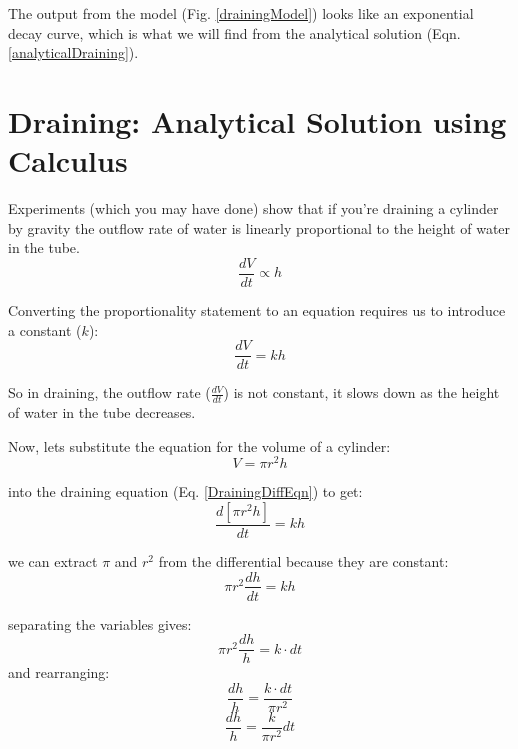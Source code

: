 \documentclass[11pt,fleqn]{article}
\begin{document}
	
	

The output from the model (Fig. \ref{drainingModel}) looks like an exponential decay curve, which is what we will find from the analytical solution (Eqn. \ref{analyticalDraining}).



\section{Draining: Analytical Solution using Calculus}
	Experiments (which you may have done) show that if you're draining a cylinder by gravity the outflow rate of water is linearly proportional to the height of water in the tube. 
	\begin{equation}
		\frac{dV}{dt} \propto h
	\end{equation}

	Converting the proportionality statement to an equation requires us to introduce a constant ($k$):
	\begin{equation}
		\label{DrainingDiffEqn}
		\frac{dV}{dt} = k h
	\end{equation}

	So in draining, the outflow rate ($\frac{dV}{dt}$) is not constant, it slows down as the height of water in the tube decreases. 
	
	Now, lets substitute the equation for the volume of a cylinder:
	\begin{equation}
		V = \pi r^2 h
	\end{equation}
	
	into the draining equation (Eq. \ref{DrainingDiffEqn}) to get:
	\begin{equation}
		\frac{d[\pi r^2 h]}{dt} = k h
	\end{equation}

	we can extract $\pi$ and $r^2$ from the differential because they are constant:
	\begin{equation}
		\pi r^2 \frac{dh}{dt} = k h
	\end{equation}

	separating the variables gives:
	\begin{equation}
		\pi r^2 \frac{dh}{h} = k \cdot dt
	\end{equation}
	and rearranging:
	\begin{equation}
		\frac{dh}{h} = \frac{k \cdot dt}{\pi r^2 }
	\end{equation}
	\begin{equation}
		\frac{dh}{h} = \frac{k}{\pi r^2 } dt
	\end{equation}
\end{document}
